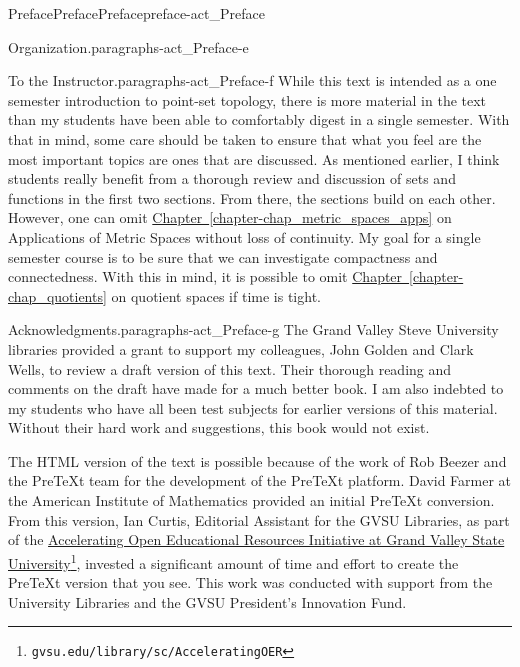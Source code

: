 \documentclass[oneside,10pt,]{book}
\newcommand{\xreffont}{\relax}
\numberwithin{equation}{chapter}
\begin{document}
\begin{preface}{Preface}{Preface}{}{Preface}{}{}{preface-act_Preface}
\begin{paragraphs}{Organization.}{paragraphs-act_Preface-e}
\begin{quote}
\end{quote}
\end{paragraphs}%
\begin{paragraphs}{To the Instructor.}{paragraphs-act_Preface-f}%
While this text is intended as a one semester introduction to point-set topology, there is more material in the text than my students have been able to comfortably digest in a single semester. With that in mind, some care should be taken to ensure that what you feel are the most important topics are ones that are discussed. As mentioned earlier, I think students really benefit from a thorough review and discussion of sets and functions in the first two sections. From there, the sections build on each other. However, one can omit \hyperref[chapter-chap_metric_spaces_apps]{Chapter~{\xreffont\ref{chapter-chap_metric_spaces_apps}}} on Applications of Metric Spaces without loss of continuity. My goal for a single semester course is to be sure that we can investigate compactness and connectedness. With this in mind, it is possible to omit \hyperref[chapter-chap_quotients]{Chapter~{\xreffont\ref{chapter-chap_quotients}}} on quotient spaces if time is tight.%
\end{paragraphs}%
\begin{paragraphs}{Acknowledgments.}{paragraphs-act_Preface-g}%
The Grand Valley Steve University libraries provided a grant to support my colleagues, John Golden and Clark Wells, to review a draft version of this text. Their thorough reading and comments on the draft have made for a much better book. I am also indebted to my students who have all been test subjects for earlier versions of this material. Without their hard work and suggestions, this book would not exist.%
\par
The HTML version of the text is possible because of the work of Rob Beezer and the PreTeXt team for the development of the PreTeXt platform. David Farmer at the American Institute of Mathematics provided an initial PreTeXt conversion. From this version, Ian Curtis, Editorial Assistant for the GVSU Libraries, as part of the \href{https://www.gvsu.edu/library/sc/AcceleratingOER}{Accelerating Open Educational Resources Initiative at Grand Valley State University}\footnote{\nolinkurl{gvsu.edu/library/sc/AcceleratingOER}\label{fn-act_Preface-g-c-e}}, invested a significant amount of time and effort to create the PreTeXt version that you see. This work was conducted with support from the University Libraries and the GVSU President's Innovation Fund.%
\par

\end{paragraphs}
\end{preface}
\end{document}
